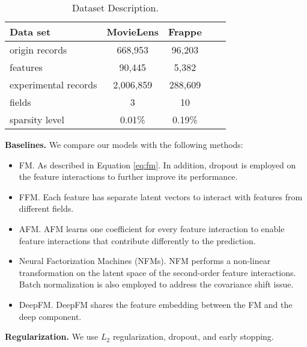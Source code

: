 \documentclass[letterpaper]{article} \usepackage{aaai19}  \usepackage{times}  \usepackage{helvet}  \usepackage{courier}  \usepackage{url}  \usepackage{graphicx}  \frenchspacing  \setlength{\pdfpagewidth}{8.5in}  \setlength{\pdfpageheight}{11in}  \usepackage{mathtools}
\begin{document}
\begin{table}[t]
\caption{Dataset Description.} \label{dataset_desc}
\begin{center}
\begin{small} 
\begin{sc} 
\begin{tabular}{lcccr} 
\hline

Data set & MovieLens & Frappe\\ 
\hline 
origin records    & 668,953 & 96,203\\
features & 90,445 & 5,382\\
experimental records & 2,006,859 & 288,609 \\
fields & 3 & 10 \\ 
sparsity level & 0.01\% & 0.19\% \\
\hline \end{tabular} \end{sc} \end{small} \end{center} \end{table} 

\textbf{Baselines.} We compare our models with the following methods:

\begin{itemize}
\item FM\cite{rendle2010factorization}. As described in Equation \ref{eq:fm}. In addition, dropout is employed on the feature interactions 
to further improve its performance.
\item FFM\cite{juan2016field}. Each feature has separate latent vectors to interact with features from different fields. 
\item AFM\cite{xiaoattentional}. AFM learns one coefficient for every feature interaction to enable feature interactions that contribute differently to the prediction. 
\item Neural Factorization Machines (NFMs)\cite{he2017neural}. NFM performs a non-linear transformation on the latent space of the second-order feature interactions. Batch normalization\cite{ioffe2015batch} is also employed 
to address the covariance shift issue.


\item DeepFM\cite{guo2017deepfm}. DeepFM shares the feature embedding between the FM and the deep component.
\end{itemize} 

\textbf{Regularization.} We use $L_2$ regularization, dropout, and early stopping.
\end{document}
